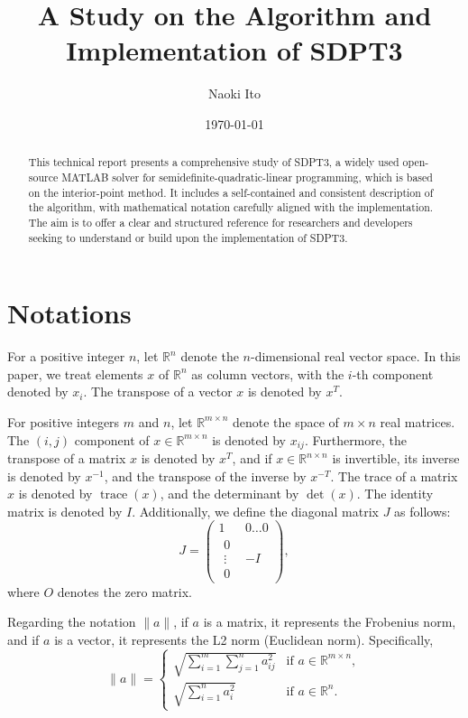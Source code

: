 \documentclass{scrartcl}
\title{A Study on the Algorithm and Implementation of SDPT3}
\author{
    Naoki Ito
}
\date{\today}
\begin{document}
\maketitle
\begin{abstract}
This technical report presents a comprehensive study of SDPT3, a widely used open-source MATLAB solver for semidefinite-quadratic-linear programming, which is based on the interior-point method.
It includes a self-contained and consistent description of the algorithm, with mathematical notation carefully aligned with the implementation. 
The aim is to offer a clear and structured reference for researchers and developers seeking to understand or build upon the implementation of SDPT3.
\end{abstract}

\tableofcontents
\section{Notations}\label{sec:notation}


For a positive integer $n$, let $\mathbb{R}^n$ denote the $n$-dimensional real vector space. In this paper, we treat elements $x$ of $\mathbb{R}^n$ as column vectors, with the $i$-th component denoted by $x_i$. The transpose of a vector $x$ is denoted by $x^T$.

For positive integers $m$ and $n$, let $\mathbb{R}^{m \times n}$ denote the space of $m \times n$ real matrices. The $(i,j)$ component of $x \in \mathbb{R}^{m \times n}$ is denoted by $x_{ij}$. Furthermore, the transpose of a matrix $x$ is denoted by $x^T$, and if $x \in \mathbb{R}^{n \times n}$ is invertible, its inverse is denoted by $x^{-1}$, and the transpose of the inverse by $x^{-T}$. The trace of a matrix $x$ is denoted by $\operatorname{trace}(x)$, and the determinant by $\operatorname{det}(x)$. The identity matrix is denoted by $I$. Additionally, we define the diagonal matrix $J$ as follows:
\[
    J = \begin{pmatrix}
         1 & 0 \ldots 0\\
         \substack{\displaystyle 0\\\displaystyle\vdots\\\displaystyle 0} & -I 
    \end{pmatrix},
\]
where $O$ denotes the zero matrix.

Regarding the notation $\|a\|$, if $a$ is a matrix, it represents the Frobenius norm, and if $a$ is a vector, it represents the L2 norm (Euclidean norm). Specifically,
\[
\|a\| = 
\begin{cases}
    \sqrt{\sum_{i=1}^m \sum_{j=1}^n a_{ij}^2} & \text{if } a \in \mathbb{R}^{m \times n},\\
    \sqrt{\sum_{i=1}^n a_i^2} & \text{if } a \in \mathbb{R}^n.
\end{cases}
\]
\end{document}
